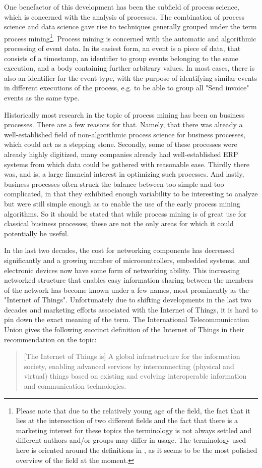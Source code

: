 \documentclass[runningheads]{template/llncs}
\begin{document}
One benefactor of this development has been the subfield of process science, which is concerned with the analysis of processes.
The combination of process science and data science gave rise to techniques generally grouped under the term process mining\footnote{Please note that due to the relatively young age of the field, the fact that it lies at the intersection of two different fields and the fact that there is a marketing interest for these topics the terminology is not always settled and different authors and/or groups may differ in usage. The terminology used here is oriented around the definitions in \cite{Aals16}, as it seems to be the most polished overview of the field at the moment.}.
Process mining is concerned with the automatic and algorithmic processing of event data. In its easiest form, an event is a piece of data, that consists of a timestamp, an identifier to group events belonging to the same execution, and a body containing further arbitrary values.
In most cases, there is also an identifier for the event type, with the purpose of identifying similar events in different executions of the process, e.g. to be able to group all "Send invoice" events as the same type.

Historically most research in the topic of process mining has been on business processes. 
There are a few reasons for that. 
Namely, that there was already a well-established field of non-algorithmic process science for business processes, which could act as a stepping stone.
Secondly, some of these processes were already highly digitized, many companies already had well-established ERP systems from which data could be gathered with reasonable ease.
Thirdly there was, and is, a large financial interest in optimizing such processes.
And lastly, business processes often struck the balance between too simple and too complicated, in that they exhibited enough variability to be interesting to analyze but were still simple enough as to enable the use of the early process mining algorithms.
So it should be stated that while process mining is of great use for classical business processes, these are not the only areas for which it could potentially be useful.

In the last two decades, the cost for networking components has decreased significantly and a growing number of microcontrollers, embedded systems, and electronic devices now have some form of networking ability.
This increasing networked structure that enables easy information sharing between the members of the network has become known under a few names, most prominently as the "Internet of Things".
Unfortunately due to shifting developments in the last two decades and marketing efforts associated with the Internet of Things, it is hard to pin down the exact meaning of the term. 
The International Telecommunication Union gives the following succinct definition of the Internet of Things in their recommendation \cite{ITUT12} on the topic:
\blockquote{[The Internet of Things is] A  global  infrastructure  for  the  information  society,  enabling  advanced  services  by  interconnecting  (physical  and  virtual)  things  based  on  existing  and  evolving  interoperable information and communication technologies.}
\end{document}
